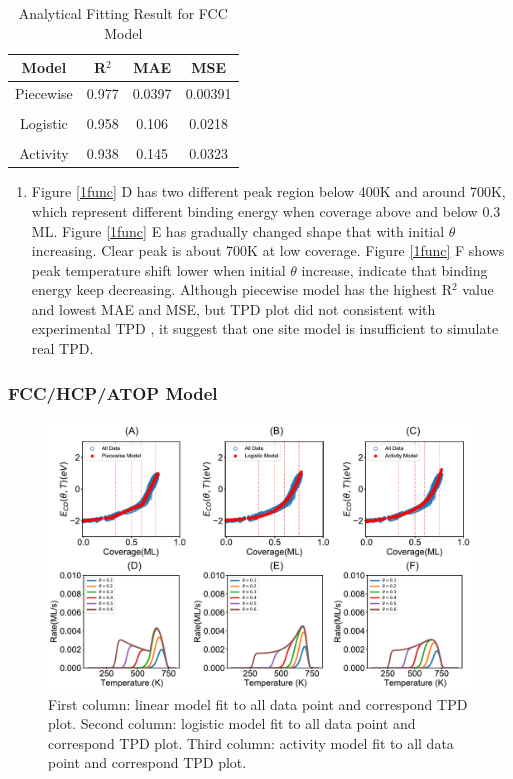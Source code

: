 \documentclass[11pt]{article}
\begin{document}
\begin{table} [h]
\caption{Analytical Fitting Result for FCC Model }
\centering
\begin{tabular} {c c c c}
\toprule
Model & R$^2$&MAE&MSE\\
\midrule
Piecewise     &0.977 &0.0397&0.00391 \\
\\
Logistic  & 0.958 &0.106&0.0218 \\
\\
Activity  & 0.938 &0.145&0.0323 \\
\bottomrule
\end{tabular}
\label{1sitefit}
\end{table}

\begin{enumerate}
\item Figure \ref{1func} D has two different peak region below 400K and around 700K, which represent different binding energy when coverage above and below 0.3 ML.  Figure \ref{1func} E has gradually changed shape that with initial $\theta$ increasing. Clear peak is about 700K at low coverage. Figure \ref{1func} F shows peak temperature shift lower when initial $\theta$ increase, indicate that binding energy keep decreasing. Although piecewise model has the highest R$^2$ value and lowest MAE and MSE, but TPD plot did not consistent with experimental TPD \cite{Guo1989}, it suggest that one site model is insufficient to simulate real TPD.
\end{enumerate}
\clearpage

\subsubsection*{FCC/HCP/ATOP Model}

\begin{figure} [h]
\centering
\includegraphics[width=15cm]{Figure/3function.pdf}
\caption{First column: linear model fit to all data point and correspond TPD plot. Second column: logistic model fit to all data point and correspond TPD plot. Third column: activity model fit to all data point and correspond TPD plot.}
\label{3func}
\end{figure}
\end{document}
